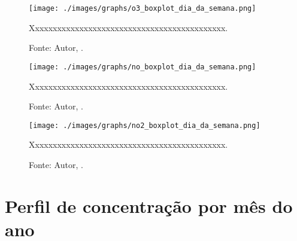 \begin{figure}[H]
    \centering
    \texttt{[image: ./images/graphs/o3\_boxplot\_dia\_da\_semana.png]}
    \caption{Xxxxxxxxxxxxxxxxxxxxxxxxxxxxxxxxxxxxxxxxxxxx.}
    \label{fig:o3_boxplot_dia_da_semana.png}
    \caption*{Fonte: Autor, \imprimirdata.}
\end{figure}




\begin{figure}[H]
    \centering
    \texttt{[image: ./images/graphs/no\_boxplot\_dia\_da\_semana.png]}
    \caption{Xxxxxxxxxxxxxxxxxxxxxxxxxxxxxxxxxxxxxxxxxxxx.}
    \label{fig:no_boxplot_dia_da_semana.png}
    \caption*{Fonte: Autor, \imprimirdata.}
\end{figure}




\begin{figure}[H]
    \centering
    \texttt{[image: ./images/graphs/no2\_boxplot\_dia\_da\_semana.png]}
    \caption{Xxxxxxxxxxxxxxxxxxxxxxxxxxxxxxxxxxxxxxxxxxxx.}
    \label{fig:no2_boxplot_dia_da_semana.png}
    \caption*{Fonte: Autor, \imprimirdata.}
\end{figure}





\section{Perfil de concentração por mês do ano}


